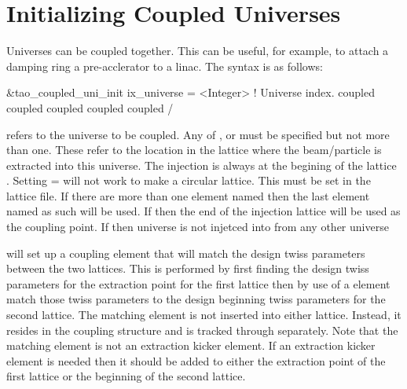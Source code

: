 \section{Initializing Coupled Universes}
\label{s:coupled_uni}

Universes can be coupled together. This can be useful, for example, to attach a
damping ring a pre-acclerator to a linac. The syntax is as follows:
\begin{example}
  &tao_coupled_uni_init
    ix_universe                = <Integer>         ! Universe index.
    coupled%
    coupled%
    coupled%
    coupled%
    coupled%
  /
\end{example}
 refers to the universe to be coupled. Any of
,  or  must be specified but
not more than one. These refer to the location in the lattice where
the beam/particle is extracted into this universe.  The injection is
always at the begining of the lattice . Setting
 =  will not work to make a circular
lattice. This must be set in the lattice file.  If there are more than
one element named  then the last element named as such
will be used. If  then the end of the injection
lattice will be used as the coupling point. If  then universe  is not injetced into from any other universe

 will set up a coupling element that will match
the design twiss parameters between the two lattices. This is
performed by first finding the design twiss parameters for the
extraction point for the first lattice then by use of a \bmad
{} element match those twiss parameters to the design
beginning twiss parameters for the second lattice. The matching
element is not inserted into either lattice. Instead, it resides in
the \tao coupling structure and is tracked through separately. Note
that the matching element is not an extraction kicker element. If an
extraction kicker element is needed then it should be added to either
the extraction point of the first lattice or the beginning of the
second lattice.

